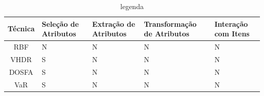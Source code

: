 \begin{table}
    \centering
    \caption {legenda}
    \begin{tabular}{|c|C{2cm}|C{2.5cm}|C{3cm}|C{2cm}|}
        \hline
        \textbf{Técnica} & 
        \textbf{Seleção de Atributos} &
        \textbf{Extração de Atributos} &
        \textbf{Transformação de Atributos} &
        \textbf{Interação com Itens} 
        \\ \hline
        RBF     & N & N & N & N \\ \hline
        VHDR    & S & N & N & N \\ \hline
        DOSFA   & S & N & N & N \\ \hline
        VaR     & S & N & N & N \\ \hline
    \end{tabular}
\end{table}



